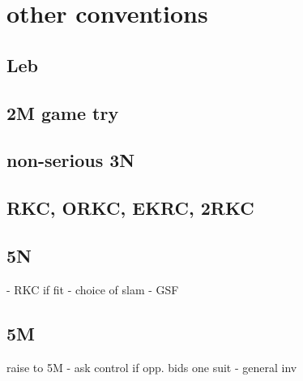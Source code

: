 \section{other conventions}

\subsection{Leb}

\subsection{2M game try}


\subsection{non-serious 3N}

\subsection{RKC, ORKC, EKRC, 2RKC}

\subsection{5N}

- RKC if fit
- choice of slam
- GSF

\subsection{5M}

raise to 5M
- ask control if opp. bids one suit
- general inv
